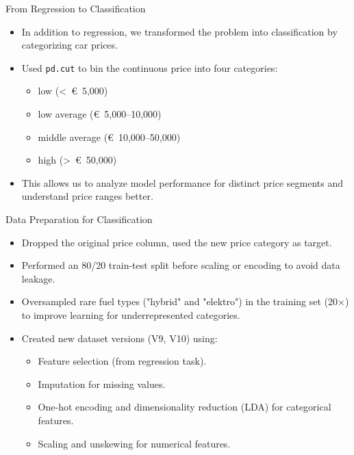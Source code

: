 \documentclass{beamer}
\begin{document}
\begin{frame}{From Regression to Classification}
        \begin{itemize}
                \item In addition to regression, we transformed the problem
                        into classification by categorizing car prices.
                \item Used \texttt{pd.cut} to bin the continuous price into
                        four categories:
                        \begin{itemize}
                                \item low (\textless~€~5,000)
                                \item low average (€~5,000–10,000)
                                \item middle average (€~10,000–50,000)
                                \item high (\textgreater~€~50,000)
                        \end{itemize}
                \item This allows us to analyze model performance for distinct
                        price segments and understand price ranges better.
        \end{itemize}
\end{frame}

\begin{frame}{Data Preparation for Classification}
        \begin{itemize}
                \item Dropped the original price column, used the new price
                        category as target.
                \item Performed an 80/20 train-test split before scaling or
                        encoding to avoid data leakage.
                \item Oversampled rare fuel types ("hybrid" and "elektro") in
                        the training set (20$\times$) to improve learning for
                        underrepresented categories.
                \item Created new dataset versions (V9, V10) using:
                        \begin{itemize}
                                \item Feature selection (from regression task).
                                \item Imputation for missing values.
                                \item One-hot encoding and dimensionality
                                        reduction (LDA) for categorical
                                        features.
                                \item Scaling and unskewing for numerical
                                        features.
                        \end{itemize}
        \end{itemize}
\end{frame}
\end{document}
